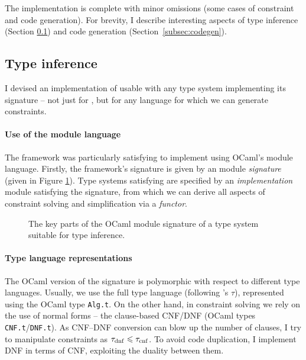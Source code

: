The implementation is complete with minor omissions (some cases of constraint and code generation). For brevity, I describe interesting aspects of type inference (Section \ref{subsec:type-inference-impl}) and code generation (Section~\ref{subsec:codegen}).

\subsection{Type inference} 
\label{subsec:type-inference-impl}

I devised an implementation of \inference{} usable with any type system implementing its signature -- not just for \fabric{}, but for any language for which we can generate constraints.

\paragraph{Use of the module language} The framework was particularly satisfying to implement using OCaml's module language. Firstly, the framework's signature is given by an module \emph{signature} (given in Figure \ref{fig:inference-signature}). Type systems satisfying are specified by an \emph{implementation} module satisfying the signature, from which we can derive all aspects of constraint solving and simplification via a \emph{functor}.

\begin{figure}[p]
    \centering
    
    \caption{The key parts of the OCaml module signature of a type system suitable for type inference.}
    \label{fig:inference-signature}
\end{figure}

\paragraph{Type language representations} The OCaml version of the signature is polymorphic with respect to different type languages. 
Usually, we use the full type language (following \inference{}'s $\tau$), represented using the OCaml type \texttt{Alg.t}. On the other hand, in constraint solving we rely on the use of normal forms -- the clause-based CNF/DNF (OCaml types \texttt{CNF.t}/\texttt{DNF.t}). As CNF--DNF conversion can blow up the number of clauses, I try to manipulate constraints as $\tau_\mathrm{dnf} \leqslant \tau_\mathrm{cnf}$. To avoid code duplication, I implement DNF in terms of CNF, exploiting the duality between them. 

